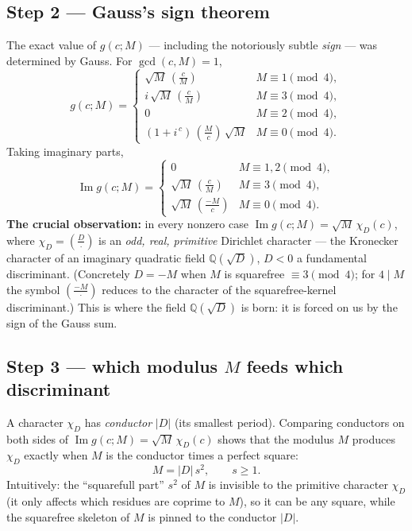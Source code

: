 \documentclass[11pt]{article}
\newcommand{\leg}[2]{\left(\frac{#1}{#2}\right)}
\DeclareMathOperator{\Imag}{Im}
\begin{document}
\subsection{Step 2 --- Gauss's sign theorem}
The exact value of $g(c;M)$ --- including the notoriously subtle \emph{sign} --- was determined by Gauss. For
$\gcd(c,M)=1$,
\[
g(c;M)=\begin{cases}
\sqrt M\,\leg{c}{M} & M\equiv1\pmod4,\\[1mm]
i\,\sqrt M\,\leg{c}{M} & M\equiv3\pmod4,\\[1mm]
0 & M\equiv2\pmod4,\\[1mm]
(1+i^{\,c})\,\leg{M}{c}\,\sqrt M & M\equiv0\pmod4.
\end{cases}
\]
Taking imaginary parts,
\[
\Imag g(c;M)=\begin{cases}0 & M\equiv1,2\pmod4,\\[1mm]
\sqrt M\,\leg{c}{M} & M\equiv3\pmod4,\\[1mm]
\sqrt M\,\leg{-M}{c} & M\equiv0\pmod4.\end{cases}
\]
\textbf{The crucial observation:} in every nonzero case $\Imag g(c;M)=\sqrt M\,\chi_D(c)$, where
$\chi_D=\leg{D}{\cdot}$ is an \emph{odd, real, primitive} Dirichlet character --- the Kronecker character of an
imaginary quadratic field $\mathbb{Q}(\sqrt D)$, $D<0$ a fundamental discriminant. (Concretely $D=-M$ when $M$ is
squarefree $\equiv3\pmod4$; for $4\mid M$ the symbol $\leg{-M}{\cdot}$ reduces to the character of the
squarefree-kernel discriminant.) This is where the field $\mathbb{Q}(\sqrt D)$ is born: it is forced on us by the
sign of the Gauss sum.

\subsection{Step 3 --- which modulus $M$ feeds which discriminant}
A character $\chi_D$ has \emph{conductor} $|D|$ (its smallest period). Comparing conductors on both sides of
$\Imag g(c;M)=\sqrt M\,\chi_D(c)$ shows that the modulus $M$ produces $\chi_D$ exactly when $M$ is the conductor
times a perfect square:
\[
M=|D|\,s^2,\qquad s\ge1.
\]
Intuitively: the ``squarefull part'' $s^2$ of $M$ is invisible to the primitive character $\chi_D$ (it only
affects which residues are coprime to $M$), so it can be any square, while the squarefree skeleton of $M$ is
pinned to the conductor $|D|$.
\end{document}

